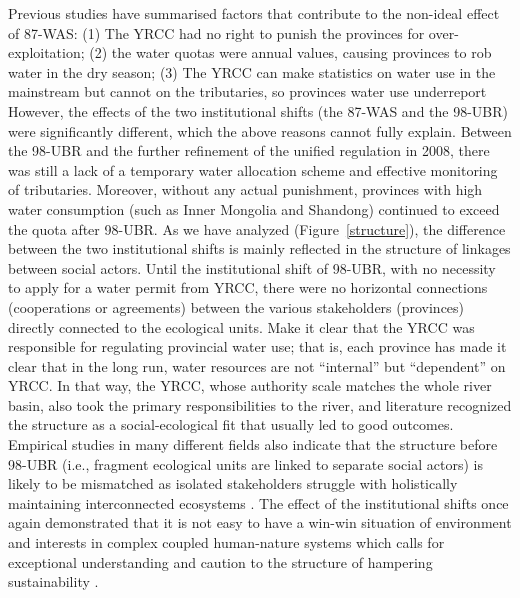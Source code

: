 Previous studies have summarised factors that contribute to the non-ideal effect of 87-WAS: (1) The YRCC had no right to punish the provinces for over-exploitation; (2) the water quotas were annual values, causing provinces to rob water in the dry season; (3) The YRCC can make statistics on water use in the mainstream but cannot on the tributaries, so provinces water use underreport %
However, the effects of the two institutional shifts (the 87-WAS and the 98-UBR) were significantly different, which the above reasons cannot fully explain.
Between the 98-UBR and the further refinement of the unified regulation in 2008, there was still a lack of a temporary water allocation scheme and effective monitoring of tributaries.
Moreover, without any actual punishment, provinces with high water consumption (such as Inner Mongolia and Shandong) continued to exceed the quota after 98-UBR.
As we have analyzed (Figure~\ref{structure}), the difference between the two institutional shifts is mainly reflected in the structure of linkages between social actors.
Until the institutional shift of 98-UBR, with no necessity to apply for a water permit from YRCC, there were no horizontal connections (cooperations or agreements) between the various stakeholders (provinces) directly connected to the ecological units.
Make it clear that the YRCC was responsible for regulating provincial water use; that is, each province has made it clear that in the long run, water resources are not ``internal'' but ``dependent'' on YRCC.
In that way, the YRCC, whose authority scale matches the whole river basin, also took the primary responsibilities to the river, and literature recognized the structure as a social-ecological fit that usually led to good outcomes.
Empirical studies in many different fields also indicate that the structure before 98-UBR (i.e., fragment ecological units are linked to separate social actors) is likely to be mismatched as isolated stakeholders struggle with holistically maintaining interconnected ecosystems
\cite{sayles2017,sayles2019,cai2016,bergsten2019}.
The effect of the institutional shifts once again demonstrated that it is not easy to have a win-win situation of environment and interests in complex coupled human-nature systems \cite{hegwood2022} which calls for exceptional understanding and caution to the structure of hampering sustainability \cite{bergsten2019, sayles2019}.

